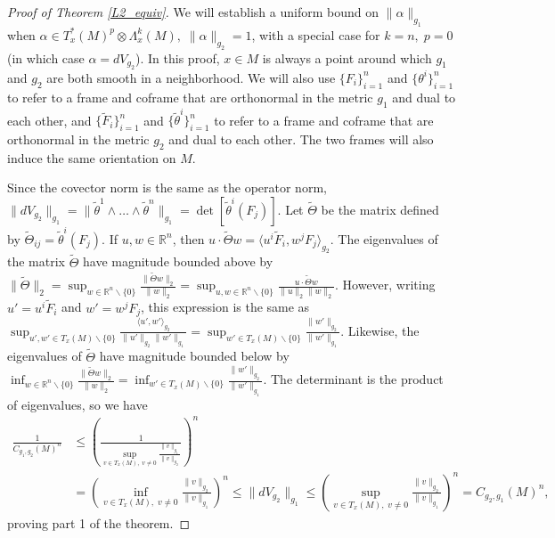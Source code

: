 \documentclass[11pt]{article}
\newcommand{\iprod}[1]{\langle #1 \rangle}
\begin{document}
\begin{proof}[Proof of Theorem \ref{L2_equiv}]
We will establish a uniform bound on $\|\alpha\|_{g_1}$ when $\alpha \in T^*_x(M)^p \otimes\Lambda^k_x(M),\; \|\alpha\|_{g_2} = 1$, with a special case for $k = n,\; p = 0$ (in which case $\alpha = dV_{g_2}$). In this proof, $x \in M$ is always a point around which $g_1$ and $g_2$ are both smooth in a neighborhood. We will also use $\{F_i\}_{i = 1}^n$ and $\{\theta^i\}_{i = 1}^n$ to refer to a frame and coframe that are orthonormal in the metric $g_1$ and dual to each other, and $\{\tilde F_i\}_{i = 1}^n$ and $\{\tilde \theta^i\}_{i = 1}^n$ to refer to a frame and coframe that are orthonormal in the metric $g_2$ and dual to each other. The two frames will also induce the same orientation on $M$.

Since the covector norm is the same as the operator norm, \\$\|dV_{g_2}\|_{g_1} = \|\tilde\theta^1 \wedge \dots \wedge \tilde\theta^n\|_{g_1} = \det{[\tilde\theta^i(F_j)]}$. Let $\tilde\Theta$ be the matrix defined by $\tilde\Theta_{ij} = \tilde \theta^i(F_j)$. If $u,w \in \mathbb{R}^n$, then $u \cdot \tilde\Theta w = \iprod{u^i\tilde F_i,w^jF_j}_{g_2}$. The eigenvalues of the matrix $\tilde \Theta$ have magnitude bounded above by $\|\tilde\Theta\|_2 = \sup_{w \in \mathbb{R}^n\backslash \{0\}} \frac{\|\tilde\Theta w\|_2}{\|w\|_2} = \sup_{u,w \in \mathbb{R}^n \backslash \{0\}} \frac{u \cdot\tilde\Theta w}{{\|u\|_2\|w\|_2}}$. However, writing $u' = u^i\tilde F_i$ and $w' = w^jF_j$, this expression is the same as $\sup_{u',w' \in T_x(M) \backslash \{0\}} \frac{\iprod{u',w'}_{g_2}}{\|u'\|_{g_2}\|w'\|_{g_1}} = \sup_{w' \in T_x(M) \backslash \{0\}} \frac{\|w'\|_{g_2}}{\|w'\|_{g_1}}$. Likewise, the eigenvalues of $\tilde\Theta$ have magnitude bounded below by $\inf_{w \in \mathbb{R}^n \backslash \{0\}} \frac{\|\tilde\Theta w\|_2}{\|w\|_2} = \inf_{w' \in T_x(M)\backslash\{0\}}\frac{\|w'\|_{g_2}}{\|w'\|_{g_1}}$. The determinant is the product of eigenvalues, so we have
\begin{align*}\frac{1}{C_{g_1,g_2}(M)^n} &\le \left(\frac{1}{\sup_{v \in T_x(M),\; v\ne 0}\frac{\|v\|_{g_1}}{\|v\|_{g_2}}}\right)^n \\
 &=\left(\inf_{v \in T_x(M),\; v\ne 0}\frac{\|v\|_{g_2}}{\|v\|_{g_1}}\right)^n \le \|dV_{g_2}\|_{g_1} \le \left(\sup_{v \in T_x(M),\;v \ne 0} \frac{\|v\|_{g_2}}{\|v\|_{g_1}}\right)^n = C_{g_2,g_1}(M)^n,\end{align*}
 proving part 1 of the theorem.


\end{proof}
\end{document}
